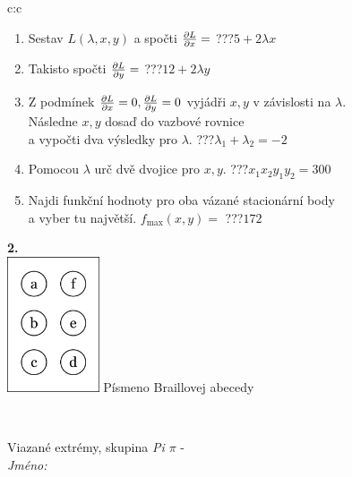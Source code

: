 \documentclass[10pt]{report}
\begin{document}
\begin{tabular}{c:c}
\begin{minipage}[c][104.5mm][t]{0.5\linewidth}
\begin{center}
\begin{minipage}{0.79\linewidth}
\begin{center}
\begin{varwidth}{\linewidth}
\begin{enumerate}
\item Sestav $L(\lambda,x,y)$ a spočti $\pdv{L}{x}=$\quad \dotfill\; ???\;\dotfill \quad $5+2\lambda x$
\item Takisto spočti $\pdv{L}{y}=$\quad \dotfill\; ???\;\dotfill \quad $12+2\lambda y$
\item Z podmínek $\pdv{L}{x}=0 , \pdv{L}{y}=0$ vyjádři $x,y$ v závislosti na $\lambda$.\\ \phantom{xxxxxx}Následne $x,y$ dosaď do vazbové rovnice\\ \phantom{xxxxxx}a vypočti dva výsledky pro $\lambda$.\quad \dotfill\; ???\;\dotfill \quad $\lambda_1+\lambda_2=-2$
\item Pomocou $\lambda$ urč dvě dvojice pro $x,y$.\quad \dotfill\; ???\;\dotfill \quad $x_1 x_2 y_1 y_2=300$
\item Najdi funkční hodnoty pro oba vázané stacionární body\\ \phantom{xxxxxx}a vyber tu najvětší. $f_{\text{max}}(x,y)=$\quad \dotfill\; ???\;\dotfill \quad $172$
\end{enumerate}
\end{varwidth}
\end{center}
\end{minipage}
\begin{minipage}{0.20\linewidth}
\begin{center}
{\Huge\bfseries 2.} \\[2mm]
\includegraphics[height=40mm]{../images/braille.png}
{\small Písmeno Braillovej abecedy}
\end{center}
\end{minipage}
\end{center}
\end{minipage}
\\ \hdashline
\begin{minipage}[c][104.5mm][t]{0.5\linewidth}
\begin{center}
\vspace{7mm}
{\huge Viazané extrémy, skupina \textit{Pi $\pi$} -}\\[5mm]
\textit{Jméno:}\phantom{xxxxxxxxxxxxxxxxxxxxxxxxxxxxxxxxxxxxxxxxxxxxxxxxxxxxxxxxxxxxxxxxx}\\[5mm]

\end{center}
\end{minipage}
\end{tabular}
\end{document}
